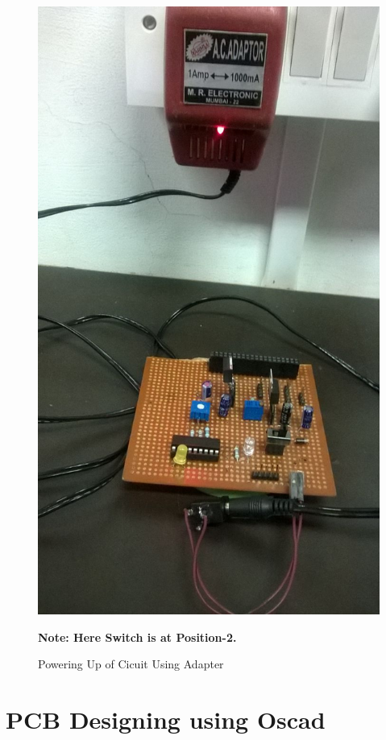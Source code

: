 \documentclass[11pt,a4paper]{article}
\begin{document}
\begin{figure}[h!]
		\includegraphics[scale=0.3]{im2.jpg}
		\centering	
		\caption{Powering Up of Cicuit Using Adapter}
			\textbf{Note: Here Switch is at Position-2.}
	\end{figure}

\newpage
	\section{PCB Designing using Oscad}
\end{document}
